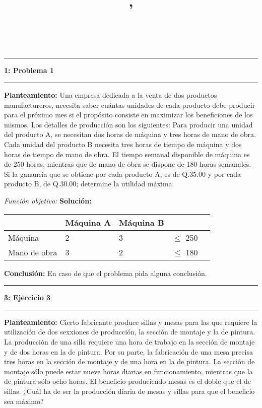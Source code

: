 \documentclass[11pt]{article}
\author{\textbf{\hmwkNombreAutor}\\ \textbf{ \vspace{0.1in}\hmwkAuthorID}}
\date{\hmwkFechaEntrega}
\title{
	\textbf{\hmwkUniversidad} \\
	\hmwkFacultad \\
	\vspace{0.1in}\hmwkSede\\
    \vspace{2.5in}
    \textmd{\textbf{\hmwkTitulo}}\\
    \vspace{0.1in}\large{\hmwkCurso , \textit{\hmwkCursoInstructor }}
    \vspace{2.5in}
}
\newcommand\problema[2]{\vspace{.12in}\hrule\textbf{#1: #2}\vspace{.5em}\hrule\vspace{.10in}}
\newcommand\planteamiento{\vspace{.10in}\textbf{Planteamiento: }}
\newcommand\solucion{\vspace{.10in}\textbf{Solución: }}
\newcommand\conclusion{\vspace{.10in}\textbf{Conclusión: }}
\newcommand\funcObj{\vspace{.10in}\textit{Función objetivo: }}
\begin{document}
\maketitle
\pagebreak

\problema{1}{Problema 1}

\planteamiento Una empresa dedicada a la venta de dos productos manufactureros, necesita saber cuántas unidades de cada producto debe producir para el próximo mes si el propósito consiste en maximizar los beneficiones de los mismos. Los detalles de producción son los siguientes: Para producir una unidad del producto A, se necesitan dos horas de máquina y tres horas de mano de obra. Cada unidad del producto B necesita tres horas de tiempo de máquina y dos horas de tiempo de mano de obra. El tiempo semanal disponible de máquina es de 250 horas, mientras que de mano de obra se dispone de 180 horas semanales. Si la ganancia que se obtiene por cada producto A, es de Q.35.00 y por cada producto B, de Q.30.00; determine la utilidad máxima.

\funcObj
\solucion
\begin{table}[h]
\centering
\begin{tabular}{lllll}
\hline
                                  & Máquina A              & Máquina B              &     &  \\ \hline
\multicolumn{1}{l|}{Máquina}      & \multicolumn{1}{l|}{2} & \multicolumn{1}{l|}{3} & {$\leq$ 250} &  \\ \cline{2-3}
\multicolumn{1}{l|}{Mano de obra} & \multicolumn{1}{l|}{3} & \multicolumn{1}{l|}{2} & $\leq$ 180 &  \\ \cline{2-3}
\end{tabular}
\end{table}

\conclusion En caso de que el problema pida alguna conclusión.


\problema{3}{Ejercicio 3}
\planteamiento
Cierto fabricante produce sillas y mesas para las que requiere la utilización de dos sexxiones de producción, la sección de montaje y la de pintura. La producción de una silla requiere una hora de trabajo en la sección de montaje y de dos horas en la de pintura. Por su parte, la fabricación de una mesa precisa tres horas en la sección de montaje y de una hora en la de pintura. La sección de montaje sólo puede estar nueve horas diarias en funcionamiento, mientras que la de pintura sólo ocho horas. El beneficio produciendo mesas es el doble que el de sillas. ¿Cuál ha de ser la producción diaria de mesas y sillas para que el beneficio sea máximo?
\end{document}

